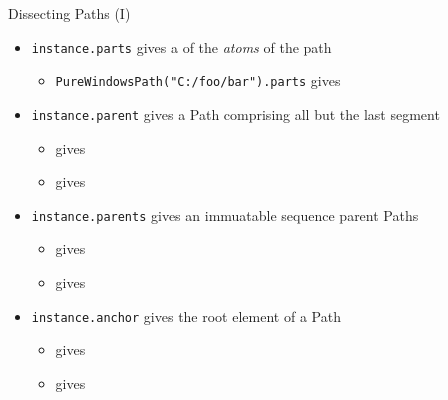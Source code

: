\begin{frame}{Dissecting Paths (I)}
%
\begin{itemize}
\item \texttt{instance.parts} gives a  of the \emph{atoms} of the path
	\begin{itemize}
	\item \texttt{PureWindowsPath("C:/foo/bar").parts} gives 
	\end{itemize}
\item \texttt{instance.parent} gives a Path comprising all but the last segment
	\begin{itemize}
	\item {} gives 
	\item {} gives 
	\end{itemize}
\item \texttt{instance.parents} gives an immuatable sequence parent Paths
	\begin{itemize}
	\item {} gives 
	\item {} gives 
	\end{itemize}
\item \texttt{instance.anchor} gives the root element of a Path
	\begin{itemize}
	\item {} gives 
	\item {} gives 
	\end{itemize}
\end{itemize}
%
\end{frame}


